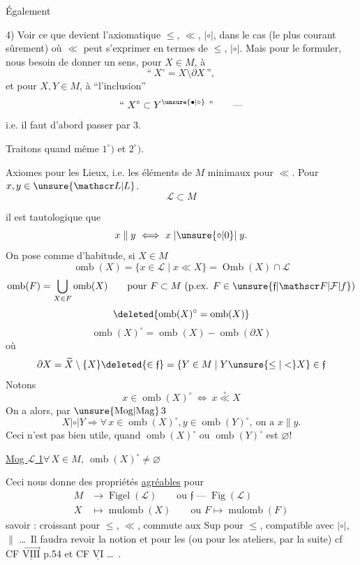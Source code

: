  Également

4) Voir ce que devient l'axiomatique $\leq$, $\ll$, $\mathrel{|\circ|}$, dans le cas (le plus courant sûrement) où $\ll$ peut s'exprimer en termes de $\leq$, $\mathrel{|\circ|}$. Mais pour le formuler, nous  besoin de donner un sens, pour $X\in M$, à
\[
\text{``}\ X^\circ=X\setminus\partial X\ \text{''},
\]
et pour $X,Y\in M$, à ``l'inclusion''
\[
\text{``}\ X^\circ\subset Y^{\unsure{\bullet|\circ}}\ \text{''}\qquad\text{---}
\]
i.e. il faut d'abord passer par 3.

Traitons quand même $1^\circ)$ et $2^\circ)$.



Axiomes pour les Lieux, i.e. les éléments de $M$ minimaux pour $\ll$. Pour $x,y\in\unsure{\mathscr L|L}$.
\[
\mathscr L\subset M
\]

il est tautologique que
\[
x\parallel y\ \Longleftrightarrow\ x\mathrel{|\unsure{\circ|0}|}y.
\]
 On pose comme d'habitude, si $X\in M$
\[
\operatorname{omb}(X)=\{x\in\mathscr L\mid x\ll X\}=\operatorname{Omb}(X)\cap\mathscr L
\]
\[
\operatorname{omb}(F)=\bigcup_{X\in F}\operatorname{omb}(X)\qquad\text{pour }F\subset M\ (\text{p.ex. }F\in\unsure{\mathfrak f|\mathscr F|\mathcal F|f})
\]
\[
\deleted{\operatorname{omb}(X)^\circ=\operatorname{omb}(X)}
\]
\[
\operatorname{omb}(X)^\circ=\operatorname{omb}(X)-\operatorname{omb}(\partial X)
\]
où
\[
\partial X=\widetilde X\setminus\{X\}\deleted{\in\mathfrak f}=\{Y\in M\mid Y\unsure{\leq|<}X\}\in\mathfrak f
\]
Notons
\[
x\in\operatorname{omb}(X)^\circ\ \Longleftrightarrow\ x\overset{\circ}{\ll}X
\]
On a alors, par $\unsure{\mathrm{Mog}|\mathrm{Mag}}\,3$
\[
X\mathrel{|\circ|}Y\Longrightarrow\forall\,x\in\operatorname{omb}(X)^\circ,y\in\operatorname{omb}(Y)^\circ,\ \text{on a }x\parallel y.
\]
Ceci n'est pas bien utile, quand $\operatorname{omb}(X)^\circ$ ou $\operatorname{omb}(Y)^\circ$ est $\varnothing$!

\uline{Mog $\mathscr L$ 1}\quad $\forall\,X\in M,\ \operatorname{omb}(X)^\circ\neq\varnothing$

Ceci nous  donne des propriétés \uline{agréables} pour
\[
\begin{aligned}
M&\longrightarrow\operatorname{Figel}(\mathscr L)\qquad\text{ou }\mathfrak f\;\text{---}\;\operatorname{Fig}(\mathscr L)\\
X&\longmapsto\operatorname{mulomb}(X)\qquad\text{ou }F\longmapsto\operatorname{mulomb}(F)
\end{aligned}
\]
savoir : croissant  pour $\leq$, $\ll$, commute aux Sup  pour $\leq$, compatible avec $\mathrel{|\circ|}$, $\parallel$ \ldots\ Il faudra revoir la notion  et   pour les   (ou pour les ateliers, par la suite) cf CF $\underline{\overrightarrow{\mathrm{VIII}}}$ p.54 et CF $\underline{\mathrm{VI}}$ \ldots\ .

